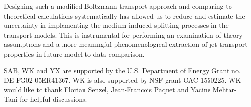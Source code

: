 \documentclass[aps, prc, reprint, amsmath, groupedaddress, nofootinbib]{revtex4-1}
\begin{document}
Designing such a modified Boltzmann transport approach and comparing to theoretical calculations systematically has allowed us to reduce and estimate the uncertainty in implementing the medium induced splitting processes in the transport models. 
This is instrumental for performing an examination of theory assumptions and a more meaningful phenomenological extraction of jet transport properties in future model-to-data comparison.

\begin{acknowledgments}
SAB, WK and YX are supported by the U.S. Department of Energy Grant no. DE-FG02-05ER41367. WK is also supported by NSF grant OAC-1550225.
WK would like to thank Florian Senzel, Jean-Francois Paquet and Yacine Mehtar-Tani for helpful discussions.
\end{acknowledgments}
\end{document}
